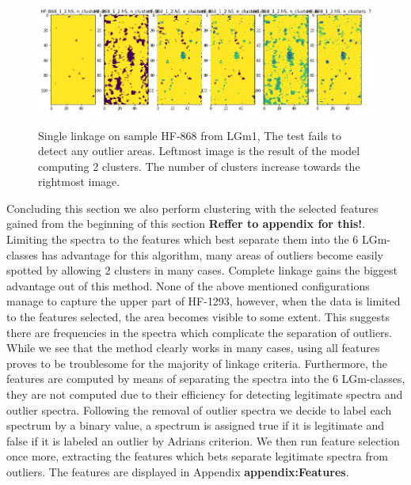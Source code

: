 \begin{figure}[H]

    \centering
{\includegraphics[width=15cm]{images/KMeans_full/LGm-1/HF-868_1_2.h5_0.png} }
\caption{Single linkage on sample HF-868 from LGm1, The test fails to detect any outlier areas. Leftmost image is the result of the model computing 2 clusters. The number of clusters increase towards the rightmost image.\label{fig:SL_HF868}}%

\end{figure}



Concluding this section we also perform clustering with the selected features gained from the beginning of this section \textbf{Reffer to appendix for this!}. Limiting the spectra to the features which best separate them into the 6 LGm-classes has advantage for this algorithm, many areas of outliers become easily spotted by allowing 2 clusters in many cases. Complete linkage gains the biggest advantage out of this method. None of the above mentioned configurations manage to capture the upper part of HF-1293, however, when the data is limited to the features selected, the area becomes visible to some extent. This suggests there are frequencies in the spectra which complicate the separation of outliers. While we see that the method clearly works in many cases, using all features proves to be troublesome for the majority of linkage criteria. Furthermore, the features are computed by means of separating the spectra into the 6 LGm-classes, they are not computed due to their efficiency for detecting legitimate spectra and outlier spectra. Following the removal of outlier spectra we decide to label each spectrum by a binary value, a spectrum is assigned true if it is legitimate and false if it is labeled an outlier by Adrians criterion. We then run feature selection once more, extracting the features which bets separate legitimate spectra from outliers. The features are displayed in Appendix \textbf{appendix:Features}.